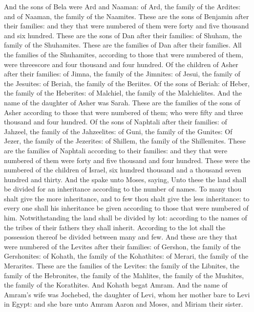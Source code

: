 \begin{biblechapter}
\verse And the sons of Bela were Ard and Naaman: of Ard, the family of the Ardites: and of Naaman, the family of the Naamites.
\verse These are the sons of Benjamin after their families: and they that were numbered of them were forty and five thousand and six hundred.
\verse These are the sons of Dan after their families: of Shuham, the family of the Shuhamites. These are the families of Dan after their families.
\verse All the families of the Shuhamites, according to those that were numbered of them, were threescore and four thousand and four hundred.
\verse Of the children of Asher after their families: of Jimna, the family of the Jimnites: of Jesui, the family of the Jesuites: of Beriah, the family of the Beriites.
\verse Of the sons of Beriah: of Heber, the family of the Heberites: of Malchiel, the family of the Malchielites.
\verse And the name of the daughter of Asher was Sarah.
\verse These are the families of the sons of Asher according to those that were numbered of them; who were fifty and three thousand and four hundred.
\verse Of the sons of Naphtali after their families: of Jahzeel, the family of the Jahzeelites: of Guni, the family of the Gunites:
\verse Of Jezer, the family of the Jezerites: of Shillem, the family of the Shillemites.
\verse These are the families of Naphtali according to their families: and they that were numbered of them were forty and five thousand and four hundred.
\verse These were the numbered of the children of Israel, six hundred thousand and a thousand seven hundred and thirty.
\verse And the \LORD spake unto Moses, saying,
\verse Unto these the land shall be divided for an inheritance according to the number of names.
\verse To many thou shalt give the more inheritance, and to few thou shalt give the less inheritance: to every one shall his inheritance be given according to those that were numbered of him.
\verse Notwithstanding the land shall be divided by lot: according to the names of the tribes of their fathers they shall inherit.
\verse According to the lot shall the possession thereof be divided between many and few.
\verse And these are they that were numbered of the Levites after their families: of Gershon, the family of the Gershonites: of Kohath, the family of the Kohathites: of Merari, the family of the Merarites.
\verse These are the families of the Levites: the family of the Libnites, the family of the Hebronites, the family of the Mahlites, the family of the Mushites, the family of the Korathites. And Kohath begat Amram.
\verse And the name of Amram's wife was Jochebed, the daughter of Levi, whom her mother bare to Levi in Egypt: and she bare unto Amram Aaron and Moses, and Miriam their sister.

\end{biblechapter}
